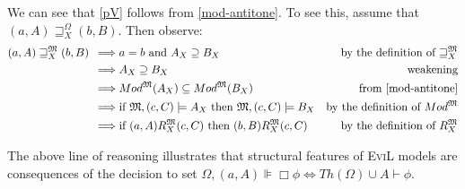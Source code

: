 We can see that \ref{pV} follows from \eqref{mod-antitone}. 
To see this, assume that $(a, A) \sqsupseteq_X^{\Omega} (b, B)$.  Then observe:
\begin{align*}
(a, A) \sqsupseteq_X^{\Omega} (b, B) & \ \implies a = b \textup{ and } A_X
\supseteq B_X & \textup{by the definition of $\sqsupseteq_X^{\Omega}$} \\
& \ \implies A_X \supseteq B_X & \textup{weakening} \\
& \ \implies Mod^{\Omega}(A_X) \subseteq Mod^{\Omega}(B_X) &
\textup{from \eqref{mod-antitone}} \\
& \ \implies \textup{if } \Omega,(c,C)\models A_X\textup{ then }
\Omega,(c,C)\models B_X &
\textup{by the definition of $Mod^{\Omega}$} \\
& \ \implies \textup{if } (a, A) R^{\Omega}_X (c,C)\textup{ then }
(b, B) R^{\Omega}_X (c,C)  &
\textup{by the definition of $R_X^\Omega$} \\
\end{align*}

The above line of reasoning illustrates that structural 
features of \textsc{EviL} models are consequences of
the decision to set $\Omega,(a,A) \VDash \Box \phi \iff Th(\Omega)
\cup A \vdash \phi$.



